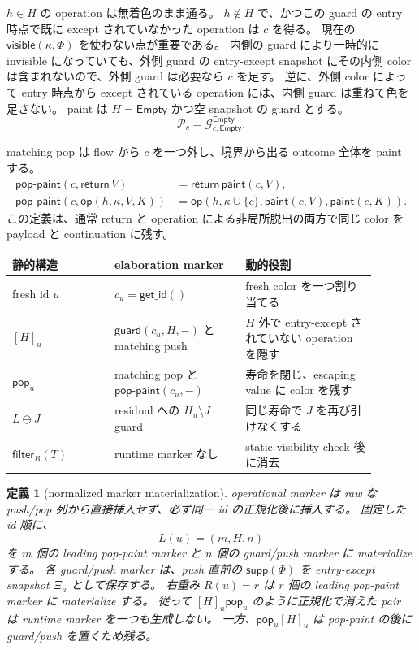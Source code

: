 \documentclass[uplatex,dvipdfmx,a4paper,10.5pt]{jsarticle}
\theoremstyle{jpplain}
\newtheorem{definition}{定義}[section]
\newcommand{\Empty}{\mathsf{Empty}}
\newcommand{\Filter}[2]{\mathsf{filter}_{#1}(#2)}
\newcommand{\takeop}[2]{[#1]_{#2}}
\newcommand{\popop}[1]{\mathsf{pop}_{#1}}
\newcommand{\supp}{\mathsf{supp}}
\newcommand{\visible}{\mathsf{visible}}
\newcommand{\guard}{\mathsf{guard}}
\newcommand{\paint}{\mathsf{paint}}
\newcommand{\getid}{\mathsf{get\_id}}
\newcommand{\ret}{\mathsf{return}\,}
\newcommand{\oper}{\mathsf{op}}
\newcommand{\poppaint}{\mathsf{pop\text{-}paint}}
\newcommand{\Guard}{\mathcal G}
\newcommand{\Paint}{\mathcal P}
\begin{document}
$h\in H$ の operation は無着色のまま通る。
$h\notin H$ で、かつこの guard の entry 時点で既に except されていなかった operation は $c$ を得る。
現在の $\visible(\kappa,\Phi)$ を使わない点が重要である。
内側の guard により一時的に invisible になっていても、外側 guard の entry-except snapshot にその内側 color は含まれないので、外側 guard は必要なら $c$ を足す。
逆に、外側 color によって entry 時点から except されている operation には、内側 guard は重ねて色を足さない。
paint は $H=\Empty$ かつ空 snapshot の guard とする。
\[
  \Paint_c=\Guard_{c,\Empty}^{\Empty}.
\]

matching pop は flow から $c$ を一つ外し、境界から出る outcome 全体を paint する。
\[
\begin{aligned}
 \poppaint(c,\ret V)
   &=\ret\paint(c,V),\\
 \poppaint(c,\oper(h,\kappa,V,K))
   &=\oper(h,\kappa\cup\{c\},\paint(c,V),\paint(c,K)).
\end{aligned}
\]
この定義は、通常 return と operation による非局所脱出の両方で同じ color を payload と continuation に残す。

\begin{formalbox}[title={static marker と colored marker の対応}]
\begin{center}
\begin{tabular}{>{\raggedright\arraybackslash}p{0.25\linewidth}p{0.32\linewidth}p{0.32\linewidth}}
\toprule
静的構造 & elaboration marker & 動的役割\\
\midrule
fresh id $u$ & $c_u=\getid()$ & fresh color を一つ割り当てる\\
$\takeop{H}{u}$ & $\guard(c_u,H,-)$ と matching push & $H$ 外で entry-except されていない operation を隠す\\
$\popop{u}$ & matching pop と $\poppaint(c_u,-)$ & 寿命を閉じ、escaping value に color を残す\\
$L\ominus J$ & residual への $H_u\setminus J$ guard & 同じ寿命で $J$ を再び引けなくする\\
$\Filter{B}{T}$ & runtime marker なし & static visibility check 後に消去\\
\bottomrule
\end{tabular}
\end{center}
\end{formalbox}

\begin{definition}[normalized marker materialization]\label{def:marker-materialization}
operational marker は raw な push/pop 列から直接挿入せず、必ず同一 id の正規化後に挿入する。
固定した id 順に、
\[
  L(u)=(m,H,n)
\]
を $m$ 個の leading pop-paint marker と $n$ 個の guard/push marker に materialize する。
各 guard/push marker は、push 直前の $\supp(\Phi)$ を entry-except snapshot $\Xi_u$ として保存する。
右重み $R(u)=r$ は $r$ 個の leading pop-paint marker に materialize する。
従って $\takeop{H}{u}\popop{u}$ のように正規化で消えた pair は runtime marker を一つも生成しない。
一方、$\popop{u}\takeop{H}{u}$ は pop-paint の後に guard/push を置くため残る。
\end{definition}
\end{document}
